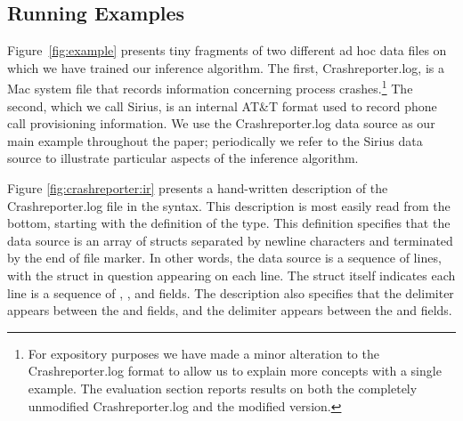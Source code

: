 \subsection{Running Examples}

Figure~\ref{fig:example} presents tiny fragments of two
different ad hoc data files on which we have trained our inference algorithm.
The first, Crashreporter.log, is a Mac
system file that records information concerning process crashes.\footnote{For
expository purposes we have made a minor alteration to the Crashreporter.log
format to allow us to explain more concepts with a single example.
The evaluation section reports results on both the  
completely unmodified Crashreporter.log and the modified version.} 
The second, which we call Sirius, is an internal AT\&T format used to
record phone call provisioning information. 
We use the Crashreporter.log data source as our main example throughout the
paper; periodically we refer to the Sirius data source to illustrate 
particular aspects of the inference algorithm.  



Figure \ref{fig:crashreporter:ir} presents a hand-written description
of the Crashreporter.log file in the \ir{} syntax.  This
description is most easily read from the bottom, starting
with the definition of the  type.  This definition specifies that
the data source is an
array of structs separated by newline characters and
terminated by the end of file marker.  In other words,
the data source is a sequence of lines, with the struct
in question appearing on each line.  
The struct itself indicates each line is a sequence of
, ,  and  fields.  
The description also specifies that the delimiter \cd{"["} 
appears between the  and  fields, and the
delimiter \cd{"]: "} appears between the  and 
 fields.


